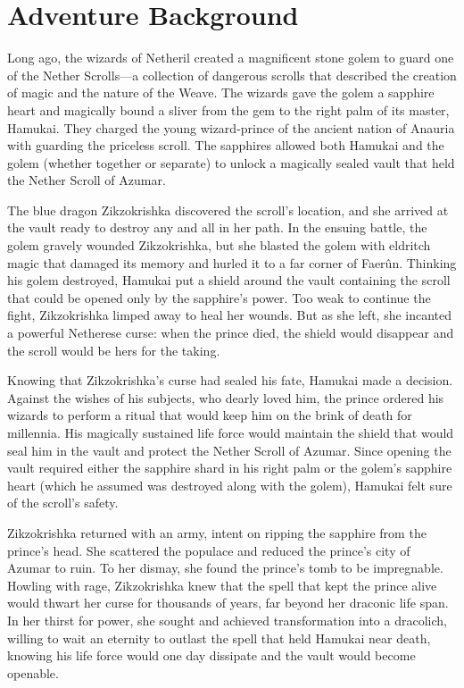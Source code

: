 \documentclass[10pt,a4paper,twoside,bg=print,twocolumn,openany,nodeprecatedcode]{dndbook}
\begin{document}
\section{Adventure Background}
Long ago, the wizards of Netheril created a magnificent stone golem to guard one of the Nether Scrolls—a collection of dangerous scrolls that described the creation of magic and the nature of the Weave. The wizards gave the golem a sapphire heart and magically bound a sliver from the gem to the right palm of its master, Hamukai. They charged the young wizard-prince of the ancient nation of Anauria with guarding the priceless scroll. The sapphires allowed both Hamukai and the golem (whether together or separate) to unlock a magically sealed vault that held the Nether Scroll of Azumar.

The blue dragon Zikzokrishka discovered the scroll's location, and she arrived at the vault ready to destroy any and all in her path. In the ensuing battle, the golem gravely wounded Zikzokrishka, but she blasted the golem with eldritch magic that damaged its memory and hurled it to a far corner of Faerûn. Thinking his golem destroyed, Hamukai put a shield around the vault containing the scroll that could be opened only by the sapphire's power. Too weak to continue the fight, Zikzokrishka limped away to heal her wounds. But as she left, she incanted a powerful Netherese curse: when the prince died, the shield would disappear and the scroll would be hers for the taking.

Knowing that Zikzokrishka's curse had sealed his fate, Hamukai made a decision. Against the wishes of his subjects, who dearly loved him, the prince ordered his wizards to perform a ritual that would keep him on the brink of death for millennia. His magically sustained life force would maintain the shield that would seal him in the vault and protect the Nether Scroll of Azumar. Since opening the vault required either the sapphire shard in his right palm or the golem's sapphire heart (which he assumed was destroyed along with the golem), Hamukai felt sure of the scroll's safety.

Zikzokrishka returned with an army, intent on ripping the sapphire from the prince's head. She scattered the populace and reduced the prince's city of Azumar to ruin. To her dismay, she found the prince's tomb to be impregnable. Howling with rage, Zikzokrishka knew that the spell that kept the prince alive would thwart her curse for thousands of years, far beyond her draconic life span. In her thirst for power, she sought and achieved transformation into a dracolich, willing to wait an eternity to outlast the spell that held Hamukai near death, knowing his life force would one day dissipate and the vault would become openable.
\end{document}
